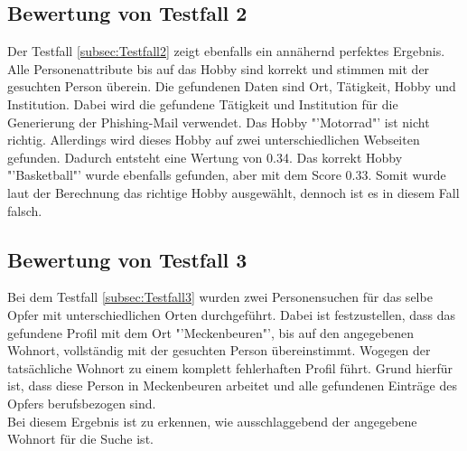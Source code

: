 	\subsection{Bewertung von Testfall 2}
	Der Testfall \ref{subsec:Testfall2} zeigt ebenfalls ein annähernd perfektes Ergebnis. Alle Personenattribute bis auf das Hobby sind korrekt und stimmen mit der gesuchten Person überein. Die gefundenen Daten sind Ort, Tätigkeit, Hobby und Institution. Dabei wird die gefundene Tätigkeit und Institution für die Generierung der Phishing-Mail verwendet. Das Hobby "'Motorrad"' ist nicht richtig. Allerdings wird dieses Hobby auf zwei unterschiedlichen Webseiten gefunden. Dadurch entsteht eine Wertung von 0.34. Das korrekt Hobby "'Basketball"' wurde ebenfalls gefunden, aber mit dem Score 0.33. Somit wurde laut der Berechnung das richtige Hobby ausgewählt, dennoch ist es in diesem Fall falsch.
	\subsection{Bewertung von Testfall 3}
	Bei dem Testfall \ref{subsec:Testfall3} wurden zwei Personensuchen für das selbe Opfer mit unterschiedlichen Orten durchgeführt. Dabei ist festzustellen, dass das gefundene Profil mit dem Ort "'Meckenbeuren"', bis auf den angegebenen Wohnort, vollständig mit der gesuchten Person übereinstimmt. Wogegen der tatsächliche Wohnort zu einem komplett fehlerhaften Profil führt. Grund hierfür ist, dass diese Person in Meckenbeuren arbeitet und alle gefundenen Einträge des Opfers berufsbezogen sind.\\
	Bei diesem Ergebnis ist zu erkennen, wie ausschlaggebend der angegebene Wohnort für die Suche ist.
